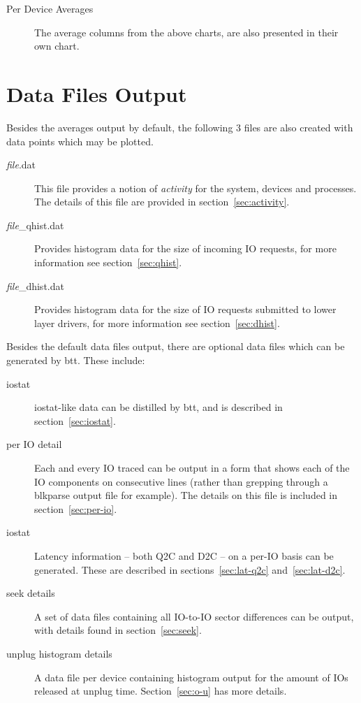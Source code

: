 \documentclass{article}
\begin{document}
\begin{description}
  \item[Per Device Averages] The average columns from the above charts,
  are also presented in their own chart.
\end{description}

\newpage\section{\label{sec:data-files}Data Files Output}

  Besides the averages output by default, the following 3 files are also
  created with data points which may be plotted.

\begin{description}
  \item[\emph{file}.dat] This file provides a notion of \emph{activity}
  for the system, devices and processes. The details of this file are
  provided in section~\ref{sec:activity}.

  \item[\emph{file}\_qhist.dat] Provides histogram data for the size of
  incoming IO requests, for more information see section~\ref{sec:qhist}.

  \item[\emph{file}\_dhist.dat] Provides histogram data for the size
  of IO requests submitted to lower layer drivers, for more information
  see section~\ref{sec:dhist}.

\end{description}

  Besides the default data files output, there are optional data files
  which can be generated by btt. These include:

  \begin{description}
    \item[iostat] iostat-like data can be distilled by btt, and is
    described in section~\ref{sec:iostat}.

    \item[per IO detail] Each and every IO traced can be output in a form
    that shows each of the IO components on consecutive lines (rather
    than grepping through a blkparse output file for example). The
    details on this file is included in section~\ref{sec:per-io}.

    \item[iostat] Latency information -- both Q2C and D2C --
    on a per-IO basis can be generated. These are described in
    sections~\ref{sec:lat-q2c} and~\ref{sec:lat-d2c}.

    \item[seek details] A set of data files containing all IO-to-IO
    sector differences can be output, with details found in
    section~\ref{sec:seek}.

    \item[unplug histogram details] A data file per device containing
    histogram output for the amount of IOs released at unplug time.
    Section~\ref{sec:o-u} has more details.
  \end{description}
\end{document}
